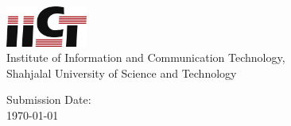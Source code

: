 \begin{center}
\vspace{1cm}
\includegraphics[width=0.2\textwidth]{Figures/IICT-logo-Main.png}\\[0.1in]
Institute of Information and Communication Technology,\\
Shahjalal University of Science and Technology\\
\begin{center}
Submission Date:\\ 
\small{\today}
\end{center}


\end{center}

\restoregeometry